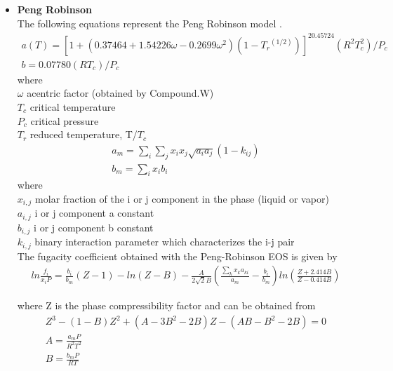 \documentclass[12pt]{report}
\begin{document}
\begin{itemize}
\item{\textbf{Peng Robinson}} \\
The following equations represent the Peng Robinson model \cite{PR}.
\begin{gather*}
a(T) = [1+(0.37464 + 1.54226\omega - 0.2699\omega^2)(1-T{_r}^{(1/2)})] ^20.45724(R^2T_c^2)/P_c \\
b = 0.07780(RT_c)/P_c
\end{gather*}
where \\
$\omega$  acentric factor (obtained by Compound.W) \\
$T_c$ critical temperature \\
$P_c$ critical pressure \\
$T_r$ reduced temperature, T/$T_c$ \\
\begin{gather*}
a_m = \sum_i\sum_jx_ix_j\sqrt{a_ia_j}(1-k_{ij}) \\
b_m = \sum_ix_ib_i
\end{gather*}
where \\
$x_{i,j}$ molar fraction of the i or j component in the phase (liquid or vapor) \\
$a_{i,j}$ i or j component a constant \\
$b_{i,j}$ i or j component b constant \\
$k_{i,j}$ binary interaction parameter which characterizes the i-j pair \\

The fugacity coefficient obtained with the Peng-Robinson EOS \cite{DWSIM} is given by
\begin{gather*}
ln\frac{f_i}{x_iP} = \frac{b_i}{b_m}(Z-1) - ln(Z-B) - \frac{A}{2\sqrt{2}B}(\frac{\sum_kx_ka_{ki}}{a_m} - \frac{b_i}{b_m})ln(\frac{Z+2.414B}{Z-0.414B})
\end{gather*}

where Z is the phase compressibility factor and can be obtained from 
\begin{gather*}
Z^3 - (1-B)Z^2 + (A-3B^2-2B)Z - (AB-B^2-2B) = 0 \\
A = \frac{a_mP}{R^2T^2} \\
B = \frac{b_mP}{RT} \\
\end{gather*}


\end{itemize}
\end{document}
